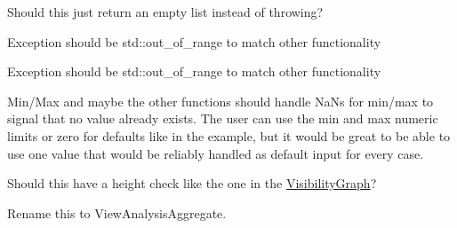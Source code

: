 \begin{DoxyRefList}
%
Should this just return an empty list instead of throwing?  
\item[Member \mbox{\hyperlink{a02071_a556efc898ddc67b64fff560d0c7b5a0a}{HF\+::Spatial\+Structures\+::Node\+::operator\mbox{[}\mbox{]}}} (int i)]\label{a00452__todo000028}%
%
Exception should be std\+::out\+\_\+of\+\_\+range to match other functionality 
\item[Member \mbox{\hyperlink{a02071_ae3e88bd4eecfdbd93431953ed07b8a7b}{HF\+::Spatial\+Structures\+::Node\+::operator\mbox{[}\mbox{]}}} (int i) const]\label{a00452__todo000029}%
%
Exception should be std\+::out\+\_\+of\+\_\+range to match other functionality 
\item[Member \mbox{\hyperlink{a00466_a38c197b654c753cb656ab60e88d65120}{HF\+::View\+Analysis\+::Aggregate}} (float \&out\+\_\+total, float new\+\_\+value, const AGGREGATE\+\_\+\+TYPE agg\+\_\+type, int count=0)]\label{a00452__todo000003}%
%
Min/\+Max and maybe the other functions should handle Na\+Ns for min/max to signal that no value already exists. The user can use the min and max numeric limits or zero for defaults like in the example, but it would be great to be able to use one value that would be reliably handled as default input for every case.  
\item[Member \mbox{\hyperlink{a00459_ga78f77d24531d0fa55c9b60d7ec1bf32a}{HF\+::View\+Analysis\+::Spherical\+Rayshoot\+With\+Any\+RTFor\+Distance}} (RT \&ray\+\_\+tracer, const std\+::vector$<$ N $>$ \&Nodes, int num\+\_\+rays, float upward\+\_\+limit=50.\+0f, float downward\+\_\+limit=70.\+0f, float height=1.\+7f, const AGGREGATE\+\_\+\+TYPE aggregation=\mbox{\hyperlink{a00466_a1fcaa17d2a8df8896a3b0447973bd07ba6970bdc2201030b9c03fbdcf3973858a}{AGGREGATE\+\_\+\+TYPE\+::\+SUM}})]\label{a00452__todo000005}%
%
Should this have a height check like the one in the \mbox{\hyperlink{a00467}{Visibility\+Graph}}?

\label{a00452__todo000006}%
%
Rename this to View\+Analysis\+Aggregate.


\end{DoxyRefList}
